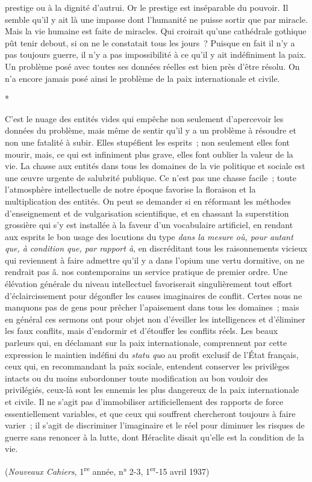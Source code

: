 \documentclass[french,twoside]{book} %
\begin{document}
prestige ou à la dignité d'autrui. Or le prestige est inséparable du pouvoir. Il semble qu'il y ait là une impasse dont l'humanité ne puisse sortir que par miracle. Mais la vie humaine est faite de miracles. Qui croirait qu'une cathédrale gothique pût tenir debout, si on ne le constatait tous les jours ? Puisque en fait il n'y a pas toujours guerre, il n'y a pas impossibilité à ce qu'il y ait indéfiniment la paix. Un problème posé avec toutes ses données réelles est bien près d'être résolu. On n'a encore jamais posé ainsi le problème de la paix internationale et civile.\par

\begin{center}
*\end{center}
\noindent C'est le nuage des entités vides qui empêche non seulement d'apercevoir les données du problème, mais même de sentir qu'il y a un problème à résoudre et non une fatalité à subir. Elles stupéfient les esprits ; non seulement elles font mourir, mais, ce qui est infiniment plus grave, elles font oublier la valeur de la vie. La chasse aux entités dans tous les domaines de la vie politique et sociale est une œuvre urgente de salubrité publique. Ce n'est pas une chasse facile ; toute l'atmosphère intellectuelle de notre époque favorise la floraison et la multiplication des entités. On peut se demander si en réformant les méthodes d'enseignement et de vulgarisation scientifique, et en chassant la superstition grossière qui s'y est installée à la faveur d'un vocabulaire artifi­ciel, en rendant aux esprits le bon usage des locutions du type {\itshape dans la mesure où, pour autant que, à condition que, par rapport à}, en discréditant tous les raisonnements vicieux qui reviennent à faire admettre qu'il y a dans l'opium une vertu dormitive, on ne rendrait pas â. nos contemporains un service prati­que de premier ordre. Une élévation générale du niveau intellectuel favorise­rait singulièrement tout effort d'éclaircissement pour dégonfler les causes imaginaires de conflit. Certes nous ne manquons pas de gens pour prêcher l'apaisement dans tous les domaines ; mais en général ces sermons ont pour objet non d'éveiller les intelligences et d'éliminer les faux conflits, mais d'endormir et d'étouffer les conflits réels. Les beaux parleurs qui, en décla­mant sur la paix internationale, comprennent par cette expression le maintien indéfini du {\itshape statu qu}o au profit exclusif de l'État français, ceux qui, en recommandant la paix sociale, entendent conserver les privilèges intacts ou du moins subordonner toute modification au bon vouloir des privilégiés, ceux-là sont les ennemis les plus dangereux de la paix internationale et civile. Il ne s'agit pas d'immobiliser artificiellement des rapports de force essentiellement variables, et que ceux qui souffrent chercheront toujours à faire varier ; il s'agit de discriminer l'imaginaire et le réel pour diminuer les risques de guerre sans renoncer à la lutte, dont Héraclite disait qu'elle est la condition de la vie.\par
({\itshape Nouveaux Cahiers}, 1\textsuperscript{re} année, n° 2-3, 1\textsuperscript{er}-15 avril 1937)\par
\end{document}
